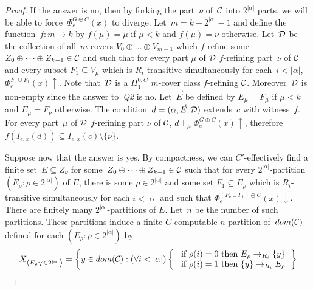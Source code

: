 \begin{proof}
If the answer is no, then by forking the part~$\nu$ of~$\mathcal{C}$ into $2^{|\alpha|}$ parts,
we will be able to force~$\Phi_e^{G \oplus C}(x)$ to diverge.
Let~$m = k+2^{|\alpha|}-1$ and define the function~$f : m \to k$ by $f(\mu) = \mu$ 
if $\mu < k$ and $f(\mu) = \nu$ otherwise.
Let~$\mathcal{D}$ be the collection of all~$m$-covers $V_0 \oplus \dots \oplus V_{m-1}$ which $f$-refine
some $Z_0 \oplus \dots \oplus Z_{k-1} \in \mathcal{C}$ and such that for every part $\mu$ of $\mathcal{D}$ 
$f$-refining part~$\nu$ of $\mathcal{C}$ and every subset $F_1 \subseteq V_\mu$
which is $R_i$-transitive simultaneously for each~$i < |\alpha|$, $\Phi_e^{F_\nu \cup F_1}(x) \uparrow$.
Note that~$\mathcal{D}$ is a $\Pi^{0,C}_1$ $m$-cover class $f$-refining $\mathcal{C}$. Moreover~$\mathcal{D}$
is non-empty since the answer to~{\itshape Q2} is no.
Let~$\vec{E}$ be defined by $E_\mu = F_\mu$ if $\mu < k$
and $E_\mu = F_\nu$ otherwise. The condition~$d = (\alpha, \vec{E}, \mathcal{D})$ extends~$c$
with witness~$f$. For every part~$\mu$ of $\mathcal{D}$ $f$-refining part $\nu$ of $\mathcal{C}$, $d \Vdash_\mu \Phi_e^{G \oplus C}(x) \uparrow$,
therefore $f(I_{e,x}(d)) \subseteq I_{e,x}(c) \setminus \{\nu\}$.

Suppose now that the answer is yes. By compactness, we can $C'$-effectively find a finite set~$E \subseteq Z_\nu$
for some~$Z_0 \oplus \dots \oplus Z_{k-1} \in \mathcal{C}$ such that for every $2^{|\alpha|}$-partition $(E_\rho : \rho \in 2^{|\alpha|})$
of $E$, there is some $\rho \in 2^{|\alpha|}$ and some set $F_1 \subseteq E_\rho$ which is $R_i$-transitive
simultaneously for each $i < |\alpha|$ and such that $\Phi_e^{(F_\nu \cup F_1) \oplus C}(x) \downarrow$.
There are finitely many $2^{|\alpha|}$-partitions of $E$. Let~$n$ be the number of such partitions. 
These partitions induce a finite $C$-computable $n$-partition of~$dom(\mathcal{C})$
defined for each $(E_\rho : \rho \in 2^{|\alpha|})$ by
$$
X_{\left\langle E_\rho : \rho \in 2^{|\alpha|} \right\rangle} = \left\{ y \in dom(\mathcal{C}) : (\forall i < |\alpha|) 
	\left\{\begin{array}{ll} 
	\mbox{ if } \rho(i) = 0 \mbox{ then } E_\rho \to_{R_i} \{y\} \\ 
	\mbox{ if } \rho(i) = 1 \mbox{ then } \{y\} \to_{R_i} E_\rho \end{array}\right. \right\}
$$


\end{proof}
